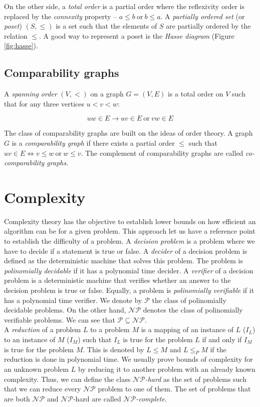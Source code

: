 On the other side, a \emph{total order} is a partial order where the reflexivity order is replaced by the \emph{connexity} property -- $a \leq b\ \text{or}\  b \leq a$. A \emph{partially ordered set} (or \emph{poset}) $(S,\leqslant)$ is a set such that the elements of $S$ are partially ordered by the relation $\leqslant$. A good way to represent a poset is the \emph{Hasse diagram} (Figure \ref{fig:hasse}).

\subsection{Comparability graphs}

A \emph{spanning order} $(V,<)$ on a graph $G = (V,E)$ is a total order on $V$ such that for any three vertices $u < v < w$:

  $$uw \in E \to uv \in E\ \text{or}\ vw \in E$$

The class of comparability graphs are built on the ideas of order theory. A graph $G$ is a \emph{comparability graph} if there exists a partial order $\leqslant$ such that $uv \in E \Leftrightarrow v \leqslant w\  \text{or}\  w \leqslant v$. The complement of comparability graphs are called \emph{co-comparability graphs}.


\section{Complexity}

Complexity theory has the objective to establish lower bounds on how efficient an algorithm can be for a given problem. This approach let us have a reference point to establish the difficulty of a problem. A \emph{decision problem} is a problem where we have to decide if a statement is true or false. A \emph{decider} of a decision problem is defined as the deterministic machine that solves this problem. The problem is \emph{polinomially decidable} if it has a polynomial time decider. A \emph{verifier} of a decision problem is a deterministic machine that verifies whether an answer to the decision problem is true or false. Equally, a problem is \emph{polinomially verifiable} if it has a polynomial time verifier. We denote by $\mathcal{P}$ the class of polinomially decidable problems. On the other hand, $\mathcal{NP}$ denotes the class of polinomially verifiable problems. We can see that $\mathcal{P} \subseteq \mathcal{NP}$.\\

A \emph{reduction} of a problem $L$ to a problem $M$ is a mapping of an instance of $L$ ($I_L$) to an instance of $M$ ($I_M$) such that $I_L$ is true for the problem $L$ if and
only if $I_M$ is true for the problem $M$. This is denoted by $L \leq M$ and $L \leq_P M$ if the reduction is done in polynomial time. We usually prove bounds of complexity for an unknown problem $L$ by reducing it to another problem with an already known complexity. Thus, we can define the class \emph{$\mathcal{NP}$-hard} as the set of problems such that we can reduce every $\mathcal{NP}$ problem to one of them. The set of problems that are both $\mathcal{NP}$ and $\mathcal{NP}$-hard are called \emph{$\mathcal{NP}$-complete}.

